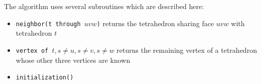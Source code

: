 \documentclass[../thesis.tex]{subfiles}
\begin{document}
The algorithm uses several subroutines which are described here:
  \begin{itemize}
    \item \texttt{neighbor(t through $uvw$)} returns the tetrahedron sharing face $uvw$ with tetrahedron $t$
    \item \texttt{vertex of $t, s \neq u, s \neq v, s \neq w$} returns the remaining vertex of a tetrahedron whose other three
    vertices are known
    \item \texttt{initialization()}
  \end{itemize}
\end{document}
